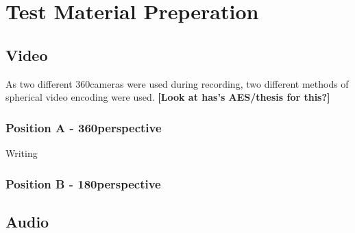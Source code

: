 \section{Test Material Preperation} %
	\subsection{Video}
		As two different 360\textdegree cameras were used during recording, two different methods of spherical video encoding were used. \textbf{[Look at has's AES/thesis for this?]}

			\subsubsection{Position A - 360\textdegree perspective}
				Writing

			\subsubsection{Position B - 180\textdegree perspective}

	\subsection{Audio}

